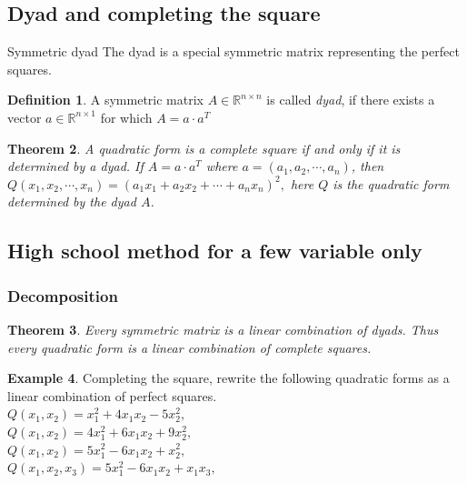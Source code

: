 \documentclass[aspectratio=169,notheorems]{corvinusmetropolis}
\newtheorem{theorem}{Theorem}
\theoremstyle{definition}
\newtheorem{definition}[theorem]{Definition}
\newtheorem{example}[theorem]{Example}
\begin{document}
\subsection{Dyad and completing the square}
\begin{frame}{Symmetric dyad}
    The dyad is a special symmetric matrix representing the perfect squares.
    \begin{definition}
        A symmetric matrix $A\in\mathbb{R}^{n\times n}$ is called \alert{\emph{dyad}}, 
        if there exists a vector
        $a\in\mathbb{R}^{n\times 1}$ for which
        \(
            A=a\cdot a^T
        \)
    \end{definition}
    \begin{theorem}
        A quadratic form is a complete square if and only if it is determined by a dyad.
        If $A=a\cdot a^T$ where $a=\left( a_1,a_2,\cdots,a_n \right)$, then
          \(
             Q\left( x_1,x_2,\cdots,x_n \right)=
              \left( a_1x_1+a_2x_2+\cdots+a_nx_n \right)^2,
          \)
        here $Q$ is the quadratic form determined by the dyad $A$.
    \end{theorem}
\end{frame}
\subsection{High school method for a few variable only}
\begin{frame}
    \frametitle{Decomposition}
    \begin{theorem}
        Every symmetric matrix is a linear combination of dyads. Thus
        every quadratic form is a linear combination of complete squares.
    \end{theorem}
\begin{example}
    Completing the square, rewrite the following quadratic forms as a linear combination of perfect squares.\\
    $Q\left( x_1,x_2 \right)=x_1^2+4x_1x_2-5x_2^2,$\\
    $Q\left( x_1,x_2 \right)=4x_1^2+6x_1x_2+9x_2^2,$\\
    $Q\left( x_1,x_2 \right)=5x_1^2-6x_1x_2+x_2^2,$\\
    $Q\left( x_1,x_2,x_3 \right)=5x_1^2-6x_1x_2+x_1x_3,$\\
\end{example}
\end{frame}
\end{document}
